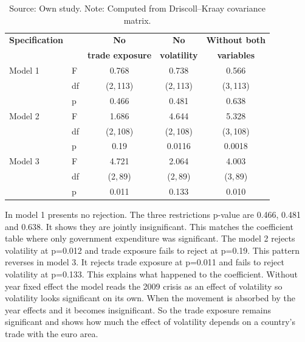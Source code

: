 \begin{table}[H]
    \centering
    \caption{Wald tests of joint restrictions}
    \vspace{\baselineskip}
    \setlength{\tabcolsep}{5pt}
    \begin{tabular}{llccc}
        \toprule
        \textbf{Specification} & &
        \textbf{No} & \textbf{No} & \textbf{Without both} \\
        & & \textbf{trade exposure} & \textbf{volatility} & \textbf{variables} \\
        \midrule
        Model 1 & F  & 0.768     & 0.738     & 0.566 \\
                   & df & (2,\,113) & (2,\,113) & (3,\,113) \\
                   & p  & 0.466     & 0.481     & 0.638 \\
        \midrule
        Model 2 & F  & 1.686       & 4.644       & 5.328   \\
                   & df & (2,\,108) & (2,\,108) & (3,\,108) \\
                   & p  & 0.19       & 0.0116       & 0.0018   \\
        \midrule
        Model 3 & F  & 4.721     & 2.064       & 4.003 \\
                   & df & (2,\,89)  & (2,\,89)  & (3,\,89) \\
                   & p  & 0.011     & 0.133       & 0.010 \\
        \bottomrule
    \end{tabular}
    \vspace{\baselineskip}
    \caption*{\footnotesize Source: Own study. Note: Computed from Driscoll--Kraay covariance matrix.}
    \label{tab:wald}
\end{table}


In model 1 presents no rejection. The three restrictions p-value are 0.466, 0.481 and 0.638.
It shows they are jointly insignificant. 
This matches the coefficient table where only government expenditure was significant.
The model 2 rejects volatility at p=0.012 and trade exposure fails to reject at p=0.19.
This pattern reverses in model 3.
It rejects trade exposure at p=0.011 and fails to reject volatility at p=0.133.
This explains what happened to the coefficient.
Without year fixed effect the model reads the 2009 crisis as an effect of volatility so volatility looks significant on its own.
When the movement is absorbed by the year effects and it becomes insignificant.
So the trade exposure remains significant and shows how much the effect of volatility depends on a country's trade with the euro area.

